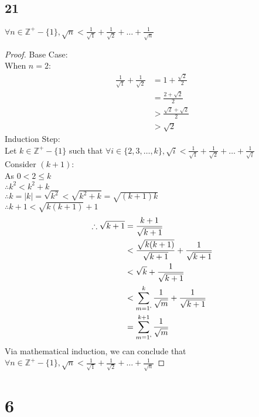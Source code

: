 \documentclass{article}
\begin{document}
\subsection{21}
$\forall n \in \mathbb{Z^+} - \{1\}, \sqrt{n} < \frac{1}{\sqrt{1}} + \frac{1}{\sqrt{2}} + \ldots + \frac{1}{\sqrt{n}}$
\begin{proof}
    Base Case:\\
    When $n = 2$:
    \begin{align*}
        \frac{1}{\sqrt{1}} + \frac{1}{\sqrt{2}} &= 1 + \frac{\sqrt{2}}{2}\\
        &= \frac{2 + \sqrt{2}}{2}\\
        &> \frac{\sqrt{2} + \sqrt{2}}{2}\\
        &> \sqrt{2}
    \end{align*}
    Induction Step:\\
    Let $k \in \mathbb{Z^+} - \{1\}$ such that $\forall i \in \{2,3,\ldots,k\},\sqrt{i} < \frac{1}{\sqrt{1}} + \frac{1}{\sqrt{2}} + \ldots + \frac{1}{\sqrt{i}}$\\
    Consider $(k+1)$:\\
    As $0 < 2 \leq k$\\
    $\therefore k^2 < k^2 + k$\\
    $\therefore k = |k| = \sqrt{k^2} < \sqrt{k^2 + k} = \sqrt{(k+1)k} $\\
    $\therefore k+1 < \sqrt{k(k+1)} + 1$\\
    \begin{align*}
        \therefore
        \sqrt{k+1} &= \frac{k+1}{\sqrt{k+1}}\\
        &< \frac{\sqrt{k(k+1)}}{\sqrt{k+1}} + \frac{1}{\sqrt{k+1}} \\
        &< \sqrt{k} + \frac{1}{\sqrt{k+1}}\\
        &< \sum_{m=1`}^k \frac{1}{\sqrt{m}} + \frac{1}{\sqrt{k+1}}\\
        &=\sum_{m=1`}^{k+1} \frac{1}{\sqrt{m}}
    \end{align*}
    Via mathematical induction, we can conclude that $\forall n \in \mathbb{Z^+} - \{1\}, \sqrt{n} < \frac{1}{\sqrt{1}} + \frac{1}{\sqrt{2}} + \ldots + \frac{1}{\sqrt{n}}$
\end{proof}

\section{6}
\end{document}
